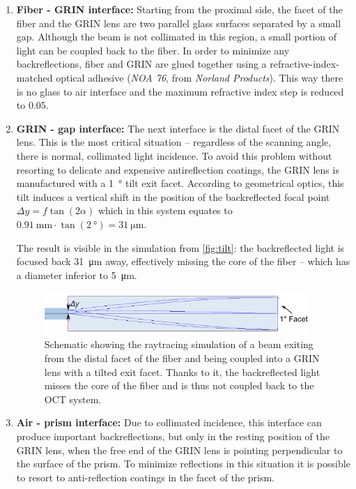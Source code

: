 \begin{enumerate}

\item \textbf{Fiber - GRIN interface:}
Starting from the proximal side, the facet of the fiber and the GRIN lens are two parallel glass surfaces separated by a small gap. Although the beam is not collimated in this region, a small portion of light can be coupled back to the fiber. In order to minimize any backreflections, fiber and GRIN are glued together using a refractive-index-matched optical adhesive (\textit{NOA 76}, from \textit{Norland Products}). This way there is no glass to air interface and the maximum refractive index step is reduced to \SI{0.05}{}.

\item \textbf{GRIN - gap interface:}
The next interface is the distal facet of the GRIN lens. This is the most critical situation -- regardless of the scanning angle, there is normal, collimated light incidence. To avoid this problem without resorting to delicate and expensive antireflection coatings, the GRIN lens is manufactured with a \SI{1}{\degree} tilt exit facet. According to geometrical optics, this tilt induces a vertical shift in the position of the backreflected focal point $\Delta y = f \tan(2\alpha)$ which in this system equates to $\SI{0.91}{\milli\meter} \cdot \tan (\SI{2}{\degree}) = \SI{31}{\micro\meter}$.

The result is visible in the simulation from \autoref{fig:tilt}: the backreflected light is focused back \SI{31}{\micro\meter} away, effectively missing the core of the fiber -- which has a diameter inferior to \SI{5}{\micro\meter}.

\begin{figure}[h!]\centering
      \includegraphics[width=10cm]{figures/30_DesignSimulation/Optical/backreflection.pdf}
      \caption{Schematic showing the raytracing simulation of a beam exiting from the distal facet of the fiber and being coupled into a GRIN lens with a tilted exit facet. Thanks to it, the backreflected light misses the core of the fiber and is thus not coupled back to the OCT system.}
      \label{fig:tilt}
\end{figure}

\item \textbf{Air - prism interface:} Due to collimated incidence, this interface can produce important backreflections, but only in the resting position of the GRIN lens, when the free end of the GRIN lens is pointing perpendicular to the surface of the prism. To minimize reflections in this situation it is possible to resort to anti-reflection coatings in the facet of the prism. 


\end{enumerate}
